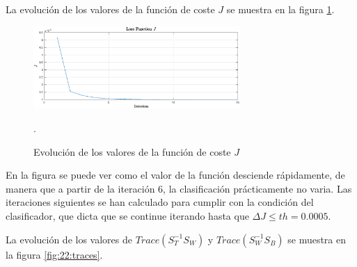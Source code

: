 \documentclass[11pt]{article} %
\begin{document}
\clearpage
{}

La evolución de los valores de la función de coste $J$ se muestra en la figura
\ref{fig:22:cost}.

\begin{figure}[h]
    \centering
    \includegraphics[width=0.7\textwidth]{../src/fig/22_cost.eps}
    \caption[]{Evolución de los valores de la función de coste $J$}.
    \label{fig:22:cost}
\end{figure}

En la figura se puede ver como el valor de la función desciende rápidamente, de
manera que a partir de la iteración 6, la clasificación prácticamente no varia.
Las iteraciones siguientes se han calculado para cumplir con la condición del
clasificador, que dicta que se continue iterando hasta
que $\Delta J \leq th = 0.0005$.

La evolución de los valores de $Trace \left( S_T^{-1} S_W \right)$ y
$Trace \left( S_W^{-1} S_B \right)$ se muestra en la figura \ref{fig:22:traces}.
\end{document}
